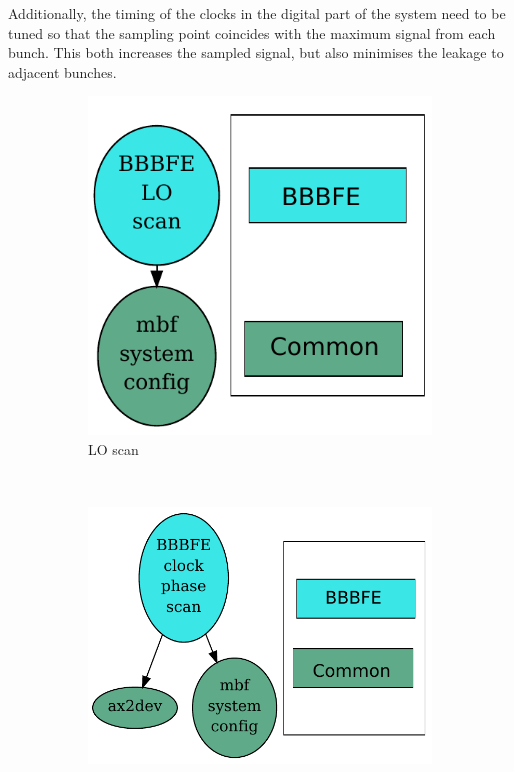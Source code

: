 \documentclass{report}
\begin{document}
Additionally, the timing of the clocks in the digital part of the system need to be tuned so that the sampling point coincides with the maximum signal from each bunch. This both increases the sampled signal, but also minimises the leakage to adjacent bunches.

\begin{figure}[hbt]
   \centering
    \begin{subfigure}[b]{0.3\textwidth}
        \includegraphics[width=\textwidth]{BBBFE_LO_scan.pdf}
        \caption{LO scan}
        \label{fig:LO_scan}
    \end{subfigure}
    ~ %
    \begin{subfigure}[b]{0.3\textwidth}
        \includegraphics[width=\textwidth]{BBBFE_clock_phase_scan.pdf}

\end{subfigure}
\end{figure}
\end{document}
